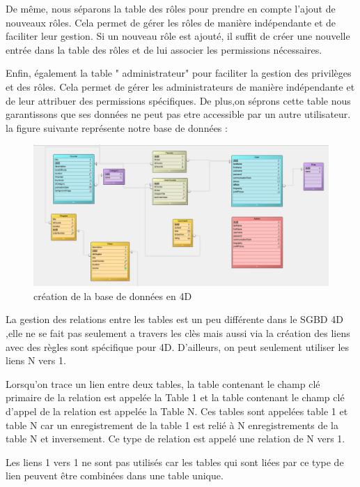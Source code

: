 De même, nous séparons  la table des rôles pour prendre en compte l'ajout de nouveaux rôles. Cela permet de gérer les rôles de manière indépendante et de faciliter leur gestion. Si un nouveau rôle est ajouté, il suffit de créer une nouvelle entrée dans la table des rôles et de lui associer les permissions nécessaires.

Enfin,  également la table " administrateur" pour faciliter la gestion des privilèges et des rôles. Cela permet de gérer les administrateurs de manière indépendante et de leur attribuer des permissions spécifiques. De plus,on séprons cette table nous garantissons que ses données ne peut pas etre accessible par un autre utilisateur. la figure suivante représente notre base de données :


\begin{figure}[H]
    \centering
\includegraphics[width=19cm]{Figures/database.PNG}

    \caption{création de la base de données en 4D}
    \label{fig:4dmonde1}
\end{figure}

La gestion des relations entre les tables est un peu différente dans le SGBD 4D ,elle ne se fait pas seulement a travers les clès mais aussi via la création des liens avec des règles sont spécifique pour 4D. D'ailleurs, on peut seulement utiliser les liens N vers 1.

Lorsqu'on  trace un lien entre deux tables, la table contenant le champ clé primaire de la relation est appelée la Table 1 et la table contenant le champ clé d’appel de la relation est appelée la Table N. Ces tables sont appelées table 1 et table N car un enregistrement de la table 1 est relié à N enregistrements de la table N et inversement. Ce type de relation est appelé une relation de N vers 1.

Les liens 1 vers 1 ne sont pas utilisés car les tables qui sont liées par ce type de lien peuvent être combinées dans une table unique.

